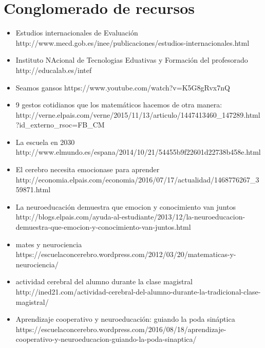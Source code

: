 
\section{Conglomerado de recursos}

\begin{itemize}
	\item
	Estudios internacionales de Evaluación
	http://www.mecd.gob.es/inee/publicaciones/estudios-internacionales.html 
	\item 
	Instituto NAcional de Tecnologias Eduativas y Formación del profesorado 
	http://educalab.es/intef
	\item 
	Seamos gansos
	https://www.youtube.com/watch?v=K5G8gRvx7nQ
	\item 
	9 gestos cotidianos que los matemáticos hacemos de otra manera:
	http://verne.elpais.com/verne/2015/11/13/articulo/1447413460_147289.html?id_externo_rsoc=FB_CM
	\item 
	La escuela en 2030
	http://www.elmundo.es/espana/2014/10/21/54455b9f22601d22738b458e.html
	\item 
	El cerebro necesita emocionase para aprender
	http://economia.elpais.com/economia/2016/07/17/actualidad/1468776267_359871.html
	\item 
	La neuroeducación demuestra que emocion y conocimiento van juntos
	http://blogs.elpais.com/ayuda-al-estudiante/2013/12/la-neuroeducacion-demuestra-que-emocion-y-conocimiento-van-juntos.html
	\item 
	mates y neurociencia
	https://escuelaconcerebro.wordpress.com/2012/03/20/matematicas-y-neurociencia/
	\item 
	actividad cerebral del alumno durante la clase magistral
	http://ined21.com/actividad-cerebral-del-alumno-durante-la-tradicional-clase-magistral/
	\item 
	Aprendizaje cooperativo y neuroeducación: guiando la poda sináptica
	https://escuelaconcerebro.wordpress.com/2016/08/18/aprendizaje-cooperativo-y-neuroeducacion-guiando-la-poda-sinaptica/

\end{itemize}
